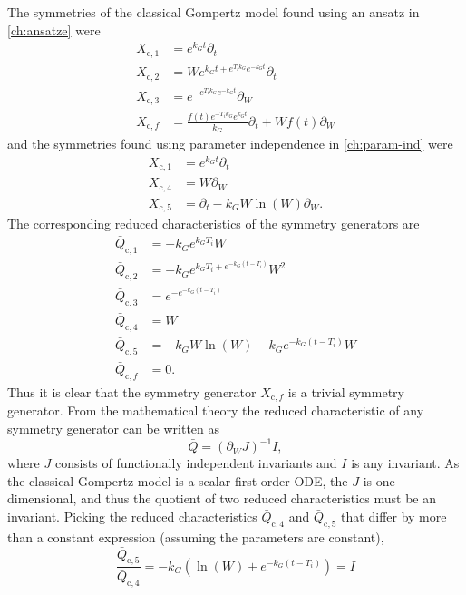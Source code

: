 The symmetries of the classical Gompertz model found using an ansatz in \cref{ch:ansatze} were
\begin{align*}
  X_{\text{c},1} &= e^{k_{G} t} \partial_t \\
  X_{\text{c},2} &= W e^{k_{G} t + e^{T_{i} k_{G}} e^{- k_{G} t}} \partial_t \\
  X_{\text{c},3} &= e^{- e^{T_{i} k_{G}} e^{- k_{G} t}} \partial_W \\
  X_{\text{c},f} &= \frac{f{\left(t \right)} e^{- T_{i} k_{G}} e^{k_{G} t}}{k_{G}} \partial_t + W f{\left(t \right)} \partial_W
\end{align*}
and the symmetries found using parameter independence in \cref{ch:param-ind} were
\begin{align*}
  X_{\text{c},1} &= e^{k_G t} \partial_t \\
  X_{\text{c},4} &= W \partial_W \\
  X_{\text{c},5} &= \partial_t - k_G W \ln\left(W\right) \partial_W.
\end{align*}
The corresponding reduced characteristics of the symmetry generators are
\begin{align*}
  \bar{Q}_{\text{c},1} &= -k_G e^{k_G T_i} W \\
  \bar{Q}_{\text{c},2} &= - k_G e^{k_{G} T_i + e^{-k_G (t - T_i)}} W^2 \\
  \bar{Q}_{\text{c},3} &= e^{- e^{- k_{G} \left(t - T_{i}\right)}} \\
  \bar{Q}_{\text{c},4} &= W \\
  \bar{Q}_{\text{c},5} &= - k_G W \ln\left(W\right) - k_G e^{-k_G (t - T_i)} W \\
  \bar{Q}_{\text{c},f} &= 0.
\end{align*}
Thus it is clear that the symmetry generator \(X_{\text{c},f}\) is a trivial symmetry generator.
From the mathematical theory the reduced characteristic of any symmetry generator can be written as
\begin{equation*}
  \bar{Q} = (\partial_W J)^{-1} I,
\end{equation*}
where \(J\) consists of functionally independent invariants and \(I\) is any invariant.
As the classical Gompertz model is a scalar first order ODE, the \(J\) is one-dimensional, and thus the quotient of two reduced characteristics must be an invariant.
Picking the reduced characteristics \(\bar{Q}_{\text{c},4}\) and \(\bar{Q}_{\text{c},5}\) that differ by more than a constant expression (assuming the parameters are constant),
\begin{equation*}
  \frac{\bar{Q}_{\text{c},5}}{\bar{Q}_{\text{c},4}} = - k_G \left(\ln\left(W\right) + e^{-k_G (t - T_i)} \right) = I
\end{equation*}
